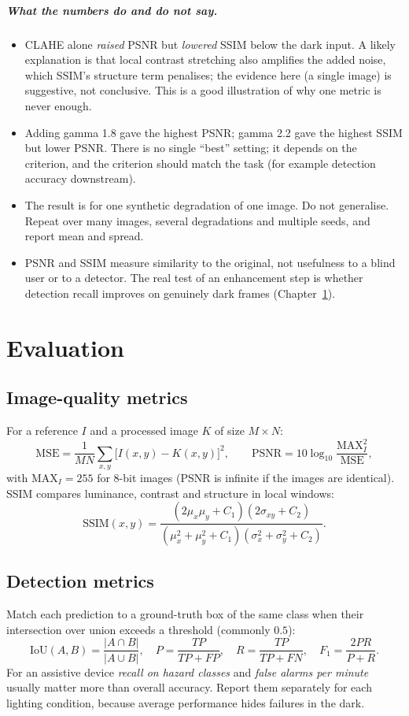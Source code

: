 \paragraph{What the numbers do and do not say.}
\begin{itemize}
  \item CLAHE alone \emph{raised} PSNR but \emph{lowered} SSIM below the dark input. A likely explanation is that local contrast stretching also amplifies the added noise, which SSIM's structure term penalises; the evidence here (a single image) is suggestive, not conclusive. This is a good illustration of why one metric is never enough.
  \item Adding gamma 1.8 gave the highest PSNR; gamma 2.2 gave the highest SSIM but lower PSNR. There is no single ``best'' setting; it depends on the criterion, and the criterion should match the task (for example detection accuracy downstream).
  \item The result is for one synthetic degradation of one image. Do not generalise. Repeat over many images, several degradations and multiple seeds, and report mean and spread.
  \item PSNR and SSIM measure similarity to the original, not usefulness to a blind user or to a detector. The real test of an enhancement step is whether detection recall improves on genuinely dark frames (Chapter~\ref{ch:eval}).
\end{itemize}

\chapter{Evaluation}
\label{ch:eval}
\section{Image-quality metrics}
For a reference $I$ and a processed image $K$ of size $M\times N$:
\[
\text{MSE}=\frac{1}{MN}\sum_{x,y}\big[I(x,y)-K(x,y)\big]^2,\qquad
\text{PSNR}=10\log_{10}\frac{\text{MAX}_I^2}{\text{MSE}},
\]
with $\text{MAX}_I=255$ for 8-bit images (PSNR is infinite if the images are identical). SSIM compares luminance, contrast and structure in local windows:
\[
\text{SSIM}(x,y)=\frac{(2\mu_x\mu_y+C_1)(2\sigma_{xy}+C_2)}{(\mu_x^2+\mu_y^2+C_1)(\sigma_x^2+\sigma_y^2+C_2)}.
\]

\section{Detection metrics}
Match each prediction to a ground-truth box of the same class when their intersection over union exceeds a threshold (commonly $0.5$):
\[
\text{IoU}(A,B)=\frac{|A\cap B|}{|A\cup B|},\quad
P=\frac{TP}{TP+FP},\quad R=\frac{TP}{TP+FN},\quad F_1=\frac{2PR}{P+R}.
\]
For an assistive device \emph{recall on hazard classes} and \emph{false alarms per minute} usually matter more than overall accuracy. Report them separately for each lighting condition, because average performance hides failures in the dark.

